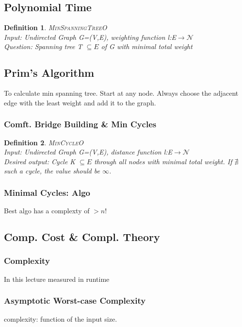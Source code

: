 \documentclass[a3paper, 8pt]{extarticle}
\newtheorem*{definition}{Definition}
\begin{document}
\begin{multicols*}{6}
\section{Polynomial Time}
\begin{definition}
\textsc{MinSpanningTreeO}\\
    Input: Undirected Graph G=(V,E), weighting function l:E$\to \mathcal{N}$\\
    Question: Spanning tree T $\subseteq E$ of G with minimal total weight
\end{definition}
\subsection{Prim's Algorithm}
To calculate min spanning tree. Start at any node. Always choose the adjacent edge with the least weight and add it to the graph.

\subsubsection{Comft. Bridge Building \& Min Cycles}
\begin{definition}
\textsc{MinCycleO}\\
    Input: Undirected Graph G=(V,E), distance function l:E$\to \mathcal{N}$\\
    Desired output: Cycle K $\subseteq E$ through all nodes with minimal total weight. If $\nexists$ such a cycle, the value should be $\infty$.
\end{definition}

\subsubsection{Minimal Cycles: Algo}
Best algo has a complexty of $> n! $
\subsection{Comp. Cost \& Compl. Theory}

\subsubsection{Complexity}
In this lecture measured in runtime 
\subsubsection{Asymptotic Worst-case Complexity}
complexity: function of the input size.


\end{multicols*}
\end{document}

